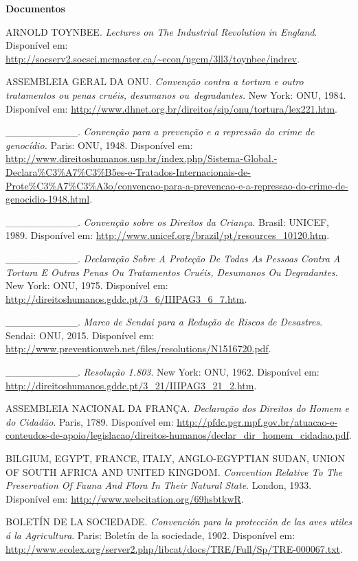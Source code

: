 \textbf{Documentos}

ARNOLD TOYNBEE. \emph{Lectures on The Industrial Revolution in England}.
Disponível em:
\url{http://socserv2.socsci.mcmaster.ca/~econ/ugcm/3ll3/toynbee/indrev}.

ASSEMBLEIA GERAL DA ONU. \emph{Convenção contra a tortura e outro
tratamentos ou penas cruéis, desumanos ou~degradantes.} New York: ONU,
1984. Disponível em:
\url{http://www.dhnet.org.br/direitos/sip/onu/tortura/lex221.htm}.

\_\_\_\_\_\_\_\_\_\_. \emph{Convenção para a prevenção e a repressão do
crime de genocídio.} Paris: ONU, 1948. Disponível em:
\url{http://www.direitoshumanos.usp.br/index.php/Sistema-Global.-Declara\%C3\%A7\%C3\%B5es-e-Tratados-Internacionais-de-Prote\%C3\%A7\%C3\%A3o/convencao-para-a-prevencao-e-a-repressao-do-crime-de-genocidio-1948.html}.

\_\_\_\_\_\_\_\_\_\_. \emph{Convenção sobre os Direitos da Criança.}
Brasil: UNICEF, 1989. Disponível em:
\url{http://www.unicef.org/brazil/pt/resources_10120.htm}.

\_\_\_\_\_\_\_\_\_\_. \emph{Declaração Sobre A Proteção De Todas As
Pessoas Contra A Tortura E Outras Penas Ou Tratamentos Cruéis, Desumanos
Ou Degradantes.} New York: ONU, 1975. Disponível em:
\url{http://direitoshumanos.gddc.pt/3_6/IIIPAG3_6_7.htm}.

\_\_\_\_\_\_\_\_\_\_. \emph{Marco de Sendai para a Redução de Riscos de
Desastres}. Sendai: ONU, 2015. Disponível em:
\url{http://www.preventionweb.net/files/resolutions/N1516720.pdf}.

\_\_\_\_\_\_\_\_\_\_. \emph{Resolução 1.803}. New York: ONU, 1962.
Disponível em:
\url{http://direitoshumanos.gddc.pt/3_21/IIIPAG3_21_2.htm}.

ASSEMBLEIA NACIONAL DA FRANÇA. \emph{Declaração dos Direitos do Homem e
do Cidadão}. Paris, 1789. Disponível em:
\url{http://pfdc.pgr.mpf.gov.br/atuacao-e-conteudos-de-apoio/legislacao/direitos-humanos/declar_dir_homem_cidadao.pdf}.

BILGIUM, EGYPT, FRANCE, ITALY, ANGLO-EGYPTIAN SUDAN, UNION OF SOUTH
AFRICA AND UNITED KINGDOM. \emph{Convention Relative To The Preservation
Of Fauna And Flora In Their Natural State}. London, 1933. Disponível em:
\url{http://www.webcitation.org/69hsbtkwR}.

BOLETÍN DE LA SOCIEDADE. \emph{Convención para la protección de las aves
utiles á la Agricultura}. Paris: Boletín de la sociedade, 1902.
Disponível em:
\url{http://www.ecolex.org/server2.php/libcat/docs/TRE/Full/Sp/TRE-000067.txt}.

